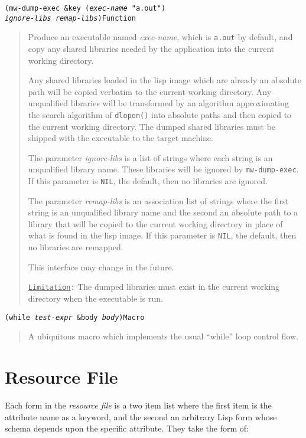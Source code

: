 \documentclass[titlepage,12pt]{book}
\newcommand{\phlabel}[1]{\phantomsection\label{#1}}
\newcommand{\xsmall}{\latexhtml{\small}{}}
\newcommand{\xnormalsize}{\latexhtml{\normalsize}{}}
\newcommand{\rfile}{\textit{resource file}\xspace}
\newcommand{\func}[1]{\mbox{\texttt{#1}}\xspace}
\newcommand{\syscall}[1]{\mbox{\texttt{#1()}}\xspace}
\newcommand{\file}[1]{\texttt{#1}\xspace}
\newcommand{\bool}[1]{\texttt{#1}\xspace}
\newcommand{\Limitation}{\texttt{\underline{Limitation}:}\xspace}
\newcommand{\apifunc}[2]{\noindent\xsmall\texttt{(#1)}\hspace*{\fill}\xnormalsize\texttt{#2}}
\newenvironment{apientry}[2]
	{\apifunc{#1}{#2}\begin{quotation}}
	{\end{quotation}}
\begin{document}
\phlabel{mw-dump-exec}
\begin{apientry}
{mw-dump-exec \&key (\emph{exec-name} "a.out")\\
\indent \emph{ignore-libs} \emph{remap-libs}}
{Function}

Produce an executable named \emph{exec-name}, which is \file{a.out}
by default, and copy any shared libraries needed by the application
into the current working directory.

Any shared libraries loaded in the lisp image which are already
an absolute path will be copied verbatim to the current working
directory. Any unqualified libraries will be transformed by an
algorithm approximating the search algorithm of \syscall{dlopen}
into absolute paths and then copied to the current working directory.
The dumped shared libraries must be shipped with the executable to
the target machine.

The parameter \emph{ignore-libs} is a list of strings where each string
is an unqualified library name. These libraries will be ignored by
\func{mw-dump-exec}. If this parameter is \bool{NIL}, the default,
then no libraries are ignored.

The parameter \emph{remap-libs} is an association list of strings
where the first string is an unqualified library name and the second
an absolute path to a library that will be copied to the current
working directory in place of what is found in the lisp image. If this
parameter is \bool{NIL}, the default, then no libraries are remapped.

This interface may change in the future.

\Limitation The dumped libraries must exist in the current working directory
	when the executable is run.
\end{apientry}

\begin{apientry}
{while \emph{test-expr} \&body \emph{body}}
{Macro}
A ubiquitous macro which implements the usual ``while'' loop control flow.
\end{apientry}

\section{Resource File}
\label{resource-file}

Each form in the \rfile is a two item list where the first item
is the attribute name as a keyword, and the second an arbitrary Lisp
form whose schema depends upon the specific attribute. They take the
form of:\\
\end{document}
